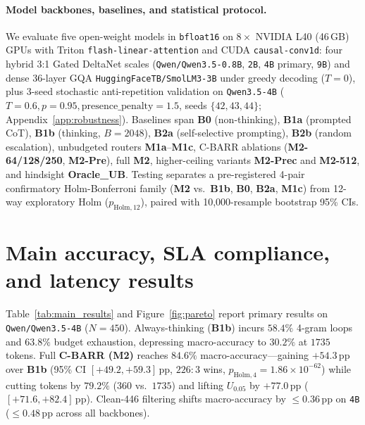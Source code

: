 \documentclass{article}
\begin{document}
\paragraph{Model backbones, baselines, and statistical protocol.}
We evaluate five open-weight models in \texttt{bfloat16} on $8\times$ NVIDIA L40 (46\,GB) GPUs with Triton \texttt{flash-linear-attention} and CUDA \texttt{causal-conv1d}: four hybrid 3:1 Gated DeltaNet scales (\texttt{Qwen/Qwen3.5-0.8B}, \texttt{2B}, \texttt{4B} primary, \texttt{9B}) \cite{yang2024gateddeltanet,yang2025qwen3} and dense 36-layer GQA \texttt{HuggingFaceTB/SmolLM3-3B} \cite{benallal2025smollm3} under greedy decoding ($T=0$), plus 3-seed stochastic anti-repetition validation on \texttt{Qwen3.5-4B} ($T=0.6, p=0.95, \text{presence\_penalty}=1.5$, seeds $\{42, 43, 44\}$; Appendix~\ref{app:robustness}). Baselines span \textbf{B0} (non-thinking), \textbf{B1a} (prompted CoT), \textbf{B1b} (thinking, $B=2048$), \textbf{B2a} (self-selective prompting), \textbf{B2b} (random escalation), unbudgeted routers \textbf{M1a}--\textbf{M1c}, C-BARR ablations (\textbf{M2-64/128/250}, \textbf{M2-Pre}), full \textbf{M2}, higher-ceiling variants \textbf{M2-Prec} and \textbf{M2-512}, and hindsight \textbf{Oracle\_UB}. Testing separates a pre-registered 4-pair confirmatory Holm-Bonferroni family (\textbf{M2} vs.\ \textbf{B1b}, \textbf{B0}, \textbf{B2a}, \textbf{M1c}) from 12-way exploratory Holm ($p_{\text{Holm},12}$), paired with 10,000-resample bootstrap 95\% CIs.



\section{Main accuracy, SLA compliance, and latency results}
\label{sec:main_results}

Table~\ref{tab:main_results} and Figure~\ref{fig:pareto} report primary results on \texttt{Qwen/Qwen3.5-4B} ($N=450$). Always-thinking (\textbf{B1b}) incurs $58.4\%$ 4-gram loops and $63.8\%$ budget exhaustion, depressing macro-accuracy to $30.2\%$ at $1735$ tokens. Full \textbf{C-BARR (M2)} reaches $84.6\%$ macro-accuracy---gaining $+54.3$\,pp over \textbf{B1b} (95\% CI $[+49.2, +59.3]$\,pp, $226\!:\!3$ wins, $p_{\text{Holm},4} = 1.86 \times 10^{-62}$) while cutting tokens by $79.2\%$ ($360$ vs.\ $1735$) and lifting $U_{0.05}$ by $+77.0$\,pp ($[+71.6, +82.4]$\,pp). Clean-446 filtering shifts macro-accuracy by $\le 0.36$\,pp on \texttt{4B} ($\le 0.48$\,pp across all backbones).
\end{document}
